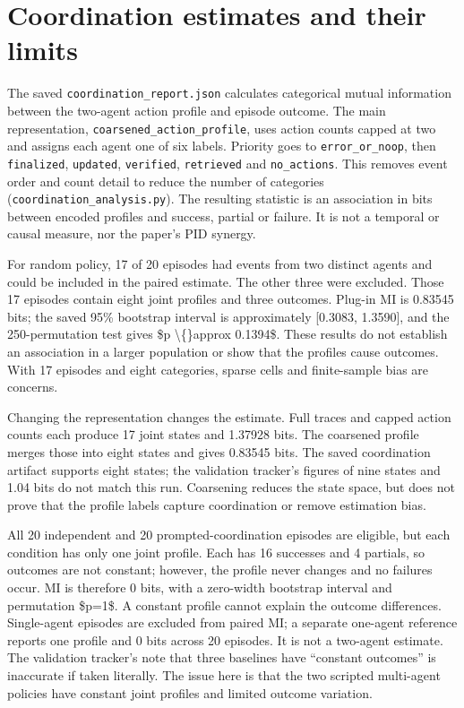 \documentclass[12pt,a4paper,oneside]{report}
\begin{document}
\section{Coordination estimates and their limits}
The saved \texttt{coordination\allowbreak\_report.json} calculates categorical mutual information between the two-agent action profile and episode outcome. The main representation, \texttt{coarsened\allowbreak\_action\allowbreak\_profile}, uses action counts capped at two and assigns each agent one of six labels. Priority goes to \texttt{error\allowbreak\_or\allowbreak\_noop}, then \texttt{finalized}, \texttt{updated}, \texttt{verified}, \texttt{retrieved} and \texttt{no\allowbreak\_actions}. This removes event order and count detail to reduce the number of categories (\texttt{coordination\allowbreak\_analysis.py}). The resulting statistic is an association in bits between encoded profiles and success, partial or failure. It is not a temporal or causal measure, nor the paper’s PID synergy.

For random policy, 17 of 20 episodes had events from two distinct agents and could be included in the paired estimate. The other three were excluded. Those 17 episodes contain eight joint profiles and three outcomes. Plug-in MI is 0.83545 bits; the saved 95\% bootstrap interval is approximately [0.3083, 1.3590], and the 250-permutation test gives \$p \textbackslash\{\}approx 0.1394\$. These results do not establish an association in a larger population or show that the profiles cause outcomes. With 17 episodes and eight categories, sparse cells and finite-sample bias are concerns.

Changing the representation changes the estimate. Full traces and capped action counts each produce 17 joint states and 1.37928 bits. The coarsened profile merges those into eight states and gives 0.83545 bits. The saved coordination artifact supports eight states; the validation tracker’s figures of nine states and 1.04 bits do not match this run. Coarsening reduces the state space, but does not prove that the profile labels capture coordination or remove estimation bias.

All 20 independent and 20 prompted-coordination episodes are eligible, but each condition has only one joint profile. Each has 16 successes and 4 partials, so outcomes are not constant; however, the profile never changes and no failures occur. MI is therefore 0 bits, with a zero-width bootstrap interval and permutation \$p=1\$. A constant profile cannot explain the outcome differences. Single-agent episodes are excluded from paired MI; a separate one-agent reference reports one profile and 0 bits across 20 episodes. It is not a two-agent estimate. The validation tracker’s note that three baselines have “constant outcomes” is inaccurate if taken literally. The issue here is that the two scripted multi-agent policies have constant joint profiles and limited outcome variation.
\end{document}
